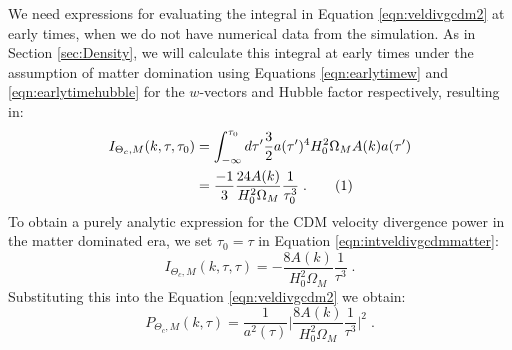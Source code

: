 \documentclass[twocolumn,superscriptaddress,prd]{revtex4}
\newcommand\numberthis{\addtocounter{equation}{1}\tag{\theequation}}
\begin{document}
We need expressions for evaluating
the integral in Equation \eqref{eqn:veldivgcdm2} at early times, when we
do not have numerical data from the simulation.  As in Section
\ref{sec:Density}, we will calculate this integral at early times under 
the assumption of matter domination using Equations \eqref{eqn:earlytimew} and \eqref{eqn:earlytimehubble} for the
$w$-vectors and Hubble factor respectively, resulting in:
\begin{align*}\label{eqn:intveldivgcdmmatter}
  I_{{\Theta_c},M}(k,\tau,\tau_0) %
           &=
  \int_{-\infty}^{\tau_0} d\tau' \frac{3}{2} a(\tau')^4 H_0^2 \Omega_M
  A(k) a(\tau') \\
  &= \frac{-1}{3} \frac{ 24 A(k) }{ H_0^2 \Omega_M}
    \frac{1}{\tau_0^3}\;. \numberthis
\end{align*}
To obtain a purely analytic expression for the CDM velocity
divergence power in the matter dominated era, we set $\tau_0 =
\tau$ in Equation \eqref{eqn:intveldivgcdmmatter}:
\begin{equation}\label{eqn:intveldivgcdmmatter2}
 I_{{\Theta_c},M}(k,\tau,\tau)  = 
                                                                     -\frac{8
                                                                     A(k)}{H_0^2
                                                                     \Omega_M}
                                                                     \frac{1}{\tau^3} \;.
\end{equation}
Substituting this into the Equation \eqref{eqn:veldivgcdm2} we obtain:
\begin{equation}\label{veldivgcdmmatter}
  P_{\Theta_c,M}(k,\tau) = \frac{1}{a^2(\tau)} \bigg| \frac{8
    A(k)}{H_0^2 \Omega_M} \frac{1}{\tau^3} \bigg|^2 \;.
\end{equation}
\end{document}
